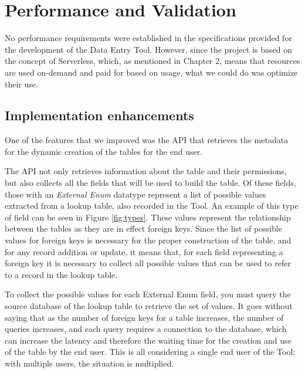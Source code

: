 

\chapter{Performance and Validation}
No performance requirements were established in the specifications provided for the development of the Data Entry Tool. However, since the project is based on the concept of Serverless, which, as mentioned in Chapter 2, means that resources are used on-demand and paid for based on usage, what we could do was optimize their use.
\section{Implementation enhancements}
One of the features that we improved was the API that retrieves the metadata for the dynamic creation of the tables for the end user.

The  API not only retrieves information about the table and their permissions, but also collects all the fields that will be used to build the table. Of these fields, those with an \emph{External Enum} datatype represent a list of possible values extracted from a lookup table, also recorded in the Tool. An example of this type of field can be seen in Figure \ref{fig:types}. These values represent the relationship between the tables as they are in effect foreign keys. Since the list of possible values for foreign keys is necessary for the proper construction of the table, and for any record addition or update, it means that, for each field representing a foreign key it is necessary to collect all possible values that can be used to refer to a record in the lookup table. 

To collect the possible values for each External Enum field, you must query the source database of the lookup table to retrieve the set of values. It goes without saying that as the number of foreign keys for a table increases, the number of queries increases, and each query requires a connection to the database, which can increase the latency and therefore the waiting time for the creation and use of the table by the end user. This is all considering a single end user of the Tool; with multiple users, the situation is multiplied.

